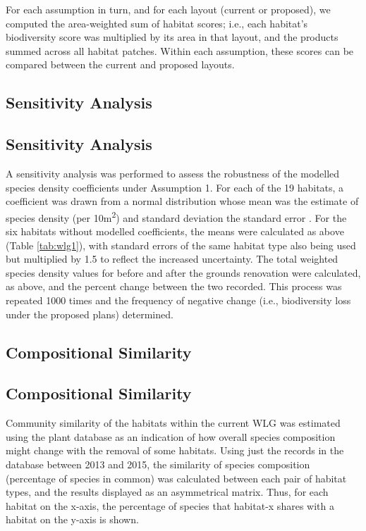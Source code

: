 For each assumption in turn, and for each layout (current or proposed), we computed the area-weighted sum of habitat scores; i.e., each habitat's biodiversity score was multiplied by its area in that layout, and the products summed across all habitat patches. Within each assumption, these scores can be compared between the current and proposed layouts.

\ifappendixStyle %
\subsection{Sensitivity Analysis}%
\else
\subsection*{Sensitivity Analysis}
\fi

A sensitivity analysis was performed to assess the robustness of the modelled species density coefficients under Assumption 1. For each of the 19 habitats, a coefficient was drawn from a normal distribution whose mean was the estimate of species density (per 10m\textsuperscript{2}) and standard deviation the standard error \citep{Newbold:2015nat}. For the six habitats without modelled coefficients, the means were calculated as above (Table \ref{tab:wlg1}), with standard errors of the same habitat type also being used but multiplied by 1.5 to reflect the increased uncertainty. The total weighted species density values for before and after the grounds renovation were calculated, as above, and the percent change between the two recorded. This process was repeated 1000 times and the frequency of negative change (i.e., biodiversity loss under the proposed plans) determined.

\ifappendixStyle %
\subsection{Compositional Similarity}%
\else
\subsection*{Compositional Similarity}
\fi

Community similarity of the habitats within the current WLG was estimated using the plant database as an indication of how overall species composition might change with the removal of some habitats. Using just the records in the database between 2013 and 2015, the similarity of species composition (percentage of species in common) was calculated between each pair of habitat types, and the results displayed as an asymmetrical matrix. Thus, for each habitat on the x-axis, the percentage of species that habitat-x shares with a habitat on the y-axis is shown.

